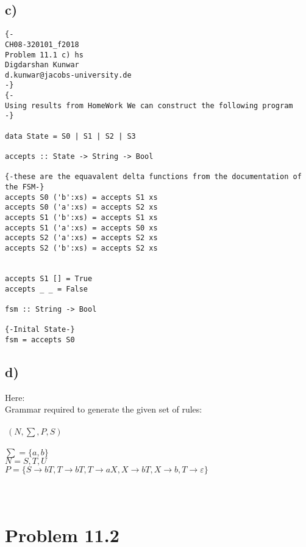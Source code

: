 \documentclass{article}
\let\epsilon\varepsilon
\begin{document}
\subsection*{c)}
\begin{verbatim}
{-
CH08-320101_f2018
Problem 11.1 c) hs
Digdarshan Kunwar
d.kunwar@jacobs-university.de
-}
{-
Using results from HomeWork We can construct the following program
-}

data State = S0 | S1 | S2 | S3

accepts :: State -> String -> Bool

{-these are the equavalent delta functions from the documentation of the FSM-}
accepts S0 ('b':xs) = accepts S1 xs
accepts S0 ('a':xs) = accepts S2 xs
accepts S1 ('b':xs) = accepts S1 xs
accepts S1 ('a':xs) = accepts S0 xs
accepts S2 ('a':xs) = accepts S2 xs
accepts S2 ('b':xs) = accepts S2 xs


accepts S1 [] = True
accepts _ _ = False

fsm :: String -> Bool

{-Inital State-}
fsm = accepts S0

\end{verbatim}

\subsection*{d)}
Here:\\
Grammar required to generate the given set of rules:\\\\
$ \ \left(N,\sum,P,S\right)$\\
\\
$\sum = \{a,b\}$ \\ 
$N={S,T,U}$\\
$P=\{ S \rightarrow bT,T \rightarrow bT,T \rightarrow aX,X \rightarrow bT,X \rightarrow b, T \rightarrow \epsilon \}$\\\\
\hline 
\text{   }\\
\section*{Problem 11.2 }
\end{document}
